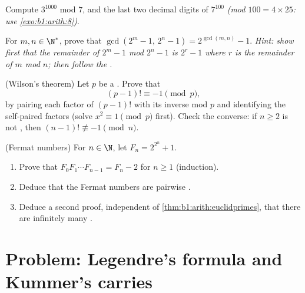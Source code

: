 \begin{exercise}[$\star\star$]\label{exo:b1:arith:9}
Compute $3^{1000}$ mod $7$, and the last two decimal digits of
$7^{100}$ \emph{(mod $100 = 4 \times 25$: use
\cref{exo:b1:arith:8})}.
\end{exercise}

\begin{exercise}[$\star\star\star$]\label{exo:b1:arith:10}
For $m, n \in \N^*$, prove that $\gcd(2^m - 1,\, 2^n - 1) =
2^{\gcd(m,n)} - 1$. \emph{Hint: show first that the remainder of $2^m
- 1$ mod $2^n - 1$ is $2^r - 1$ where $r$ is the remainder of $m$ mod
$n$; then follow the .}
\end{exercise}

\begin{exercise}[$\star\star\star$]\label{exo:b1:arith:11}
(Wilson's theorem) Let $p$ be a . Prove that
\[
(p-1)! \equiv -1 \pmod p ,
\]
by pairing each factor of $(p-1)!$ with its inverse mod $p$ and
identifying the self-paired factors (solve $x^2 \equiv 1 \pmod p$
first). Check the converse: if $n \geq 2$ is not , then $(n-1)!
\not\equiv -1 \pmod n$.
\end{exercise}

\begin{exercise}[$\star\star\star$]\label{exo:b1:arith:12}
(Fermat numbers) For $n \in \N$, let $F_n = 2^{2^n} + 1$.
\begin{enumerate}
  \item Prove that $F_0 F_1 \cdots F_{n-1} = F_n - 2$ for $n \geq
        1$ (induction).
  \item Deduce that the Fermat numbers are pairwise .
  \item Deduce a second proof, independent of
        \cref{thm:b1:arith:euclidprimes}, that there are
        infinitely many .
\end{enumerate}
\end{exercise}

\section{Problem: Legendre's formula and Kummer's carries}

